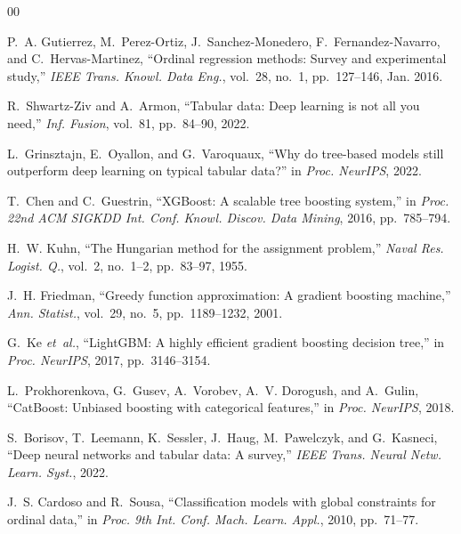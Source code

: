 \documentclass[conference]{IEEEtran}
\begin{document}
\begin{thebibliography}{00}

P.~A. Gutierrez, M.~Perez-Ortiz, J.~Sanchez-Monedero, F.~Fernandez-Navarro, and C.~Hervas-Martinez, ``Ordinal regression methods: Survey and experimental study,'' \emph{IEEE Trans. Knowl. Data Eng.}, vol.~28, no.~1, pp.~127--146, Jan. 2016.

R.~Shwartz-Ziv and A.~Armon, ``Tabular data: Deep learning is not all you need,'' \emph{Inf. Fusion}, vol.~81, pp.~84--90, 2022.

L.~Grinsztajn, E.~Oyallon, and G.~Varoquaux, ``Why do tree-based models still outperform deep learning on typical tabular data?'' in \emph{Proc. NeurIPS}, 2022.

T.~Chen and C.~Guestrin, ``XGBoost: A scalable tree boosting system,'' in \emph{Proc. 22nd ACM SIGKDD Int. Conf. Knowl. Discov. Data Mining}, 2016, pp.~785--794.

H.~W. Kuhn, ``The Hungarian method for the assignment problem,'' \emph{Naval Res. Logist. Q.}, vol.~2, no.~1--2, pp.~83--97, 1955.

J.~H. Friedman, ``Greedy function approximation: A gradient boosting machine,'' \emph{Ann. Statist.}, vol.~29, no.~5, pp.~1189--1232, 2001.

G.~Ke \emph{et~al.}, ``LightGBM: A highly efficient gradient boosting decision tree,'' in \emph{Proc. NeurIPS}, 2017, pp.~3146--3154.

L.~Prokhorenkova, G.~Gusev, A.~Vorobev, A.~V. Dorogush, and A.~Gulin, ``CatBoost: Unbiased boosting with categorical features,'' in \emph{Proc. NeurIPS}, 2018.

S.~Borisov, T.~Leemann, K.~Sessler, J.~Haug, M.~Pawelczyk, and G.~Kasneci, ``Deep neural networks and tabular data: A survey,'' \emph{IEEE Trans. Neural Netw. Learn. Syst.}, 2022.

J.~S. Cardoso and R.~Sousa, ``Classification models with global constraints for ordinal data,'' in \emph{Proc. 9th Int. Conf. Mach. Learn. Appl.}, 2010, pp.~71--77.


\end{thebibliography}
\end{document}
